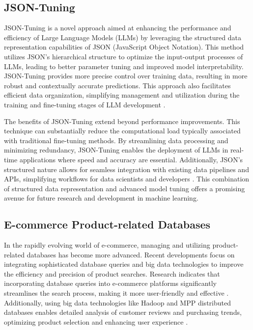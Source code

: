 \subsection*{JSON-Tuning}

JSON-Tuning is a novel approach aimed at enhancing the performance and efficiency of Large Language Models (LLMs) by leveraging the structured data representation capabilities of JSON (JavaScript Object Notation). This method utilizes JSON's hierarchical structure to optimize the input-output processes of LLMs, leading to better parameter tuning and improved model interpretability. JSON-Tuning provides more precise control over training data, resulting in more robust and contextually accurate predictions. This approach also facilitates efficient data organization, simplifying management and utilization during the training and fine-tuning stages of LLM development \cite{zheng2024llamafactory}.

The benefits of JSON-Tuning extend beyond performance improvements. This technique can substantially reduce the computational load typically associated with traditional fine-tuning methods. By streamlining data processing and minimizing redundancy, JSON-Tuning enables the deployment of LLMs in real-time applications where speed and accuracy are essential. Additionally, JSON's structured nature allows for seamless integration with existing data pipelines and APIs, simplifying workflows for data scientists and developers \cite{zhu2024lift}. This combination of structured data representation and advanced model tuning offers a promising avenue for future research and development in machine learning.

\subsection*{E-commerce Product-related Databases}

In the rapidly evolving world of e-commerce, managing and utilizing product-related databases has become more advanced. Recent developments focus on integrating sophisticated database queries and big data technologies to improve the efficiency and precision of product searches. Research indicates that incorporating database queries into e-commerce platforms significantly streamlines the search process, making it more user-friendly and effective \cite{Muntjir2016}. Additionally, using big data technologies like Hadoop and MPP distributed databases enables detailed analysis of customer reviews and purchasing trends, optimizing product selection and enhancing user experience \cite{Liang_2020}.

